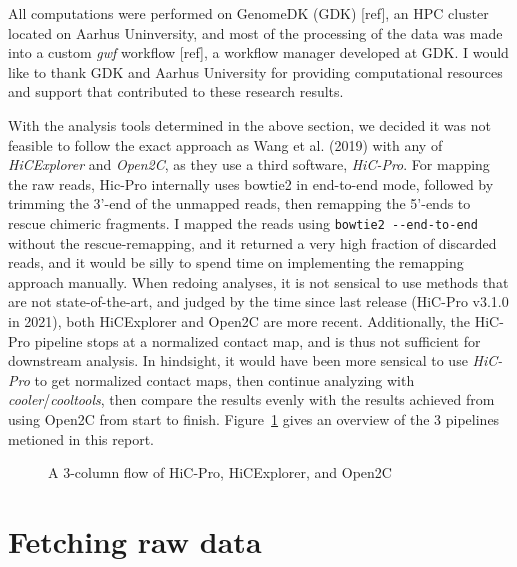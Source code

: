 \documentclass[
  11pt,
  a4paper,
]{scrbook}
\let\oldemph\emph
\renewcommand\emph[1]{\oldemph{\color{gray}#1}}
\begin{document}
All computations were performed on GenomeDK (GDK) {[}ref{]}, an HPC
cluster located on Aarhus Uninversity, and most of the processing of the
data was made into a custom \emph{gwf} workflow {[}ref{]}, a workflow
manager developed at GDK. I would like to thank GDK and Aarhus
University for providing computational resources and support that
contributed to these research results.

With the analysis tools determined in the above section, we decided it
was not feasible to follow the exact approach as Wang et al. (2019) with
any of \emph{HiCExplorer} and \emph{Open2C}, as they use a third
software, \emph{HiC-Pro}. For mapping the raw reads, Hic-Pro internally
uses bowtie2 in end-to-end mode, followed by trimming the 3'-end of the
unmapped reads, then remapping the 5'-ends to rescue chimeric fragments.
I mapped the reads using \texttt{bowtie2\ -\/-end-to-end} without the
rescue-remapping, and it returned a very high fraction of discarded
reads, and it would be silly to spend time on implementing the remapping
approach manually. When redoing analyses, it is not sensical to use
methods that are not state-of-the-art, and judged by the time since last
release (HiC-Pro v3.1.0 in 2021), both HiCExplorer and Open2C are more
recent. Additionally, the HiC-Pro pipeline stops at a normalized contact
map, and is thus not sufficient for downstream analysis. In hindsight,
it would have been more sensical to use \emph{HiC-Pro} to get normalized
contact maps, then continue analyzing with
\emph{cooler}/\emph{cooltools}, then compare the results evenly with the
results achieved from using Open2C from start to finish.
Figure~\ref{fig-hic-tools-comparison} gives an overview of the 3
pipelines metioned in this report.

\begin{figure}


\caption{\label{fig-hic-tools-comparison}A 3-column flow of HiC-Pro,
HiCExplorer, and Open2C}

\end{figure}%

\section{Fetching raw data}\label{fetching-raw-data}
\end{document}
